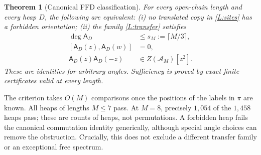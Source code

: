 \documentclass[10pt,letterpaper]{article}
\newtheorem{theorem}{Theorem}
\newcommand{\Aalg}{\mathcal A}
\newcommand{\cA}{\mathsf A}
\begin{document}
\begin{theorem}[Canonical FFD classification]\label{thm:main}\label{L:main}
For every open-chain length and every heap $D$, the following are equivalent: (i) no translated copy in \eqref{L:sites} has a forbidden orientation; (ii) the family \eqref{L:transfer} satisfies
\begin{align}
 \deg\cA_D&\le s_M:=\lceil M/3\rceil,\label{L:degree}\\
 [\cA_D(z),\cA_D(w)]&=0,\label{L:comm}\\
 \cA_D(z)\cA_D(-z)&\in Z(\Aalg_M)[z^2].\label{L:inv}
\end{align}
These are identities for arbitrary angles. Sufficiency is proved by exact finite certificates valid at every length.
\end{theorem}

The criterion takes $O(M)$ comparisons once the positions of the labels in $\pi$ are known. All heaps of lengths $M\le7$ pass. At $M=8$, precisely $1{,}054$ of the $1{,}458$ heaps pass; these are counts of heaps, not permutations. A forbidden heap fails the canonical commutation identity generically, although special angle choices can remove the obstruction. Crucially, this does not exclude a different transfer family or an exceptional free spectrum.
\end{document}
